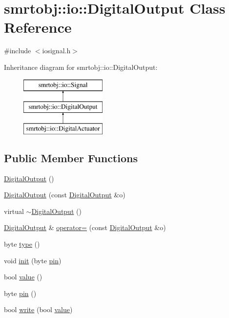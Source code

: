 \hypertarget{classsmrtobj_1_1io_1_1_digital_output}{}\section{smrtobj\+:\+:io\+:\+:Digital\+Output Class Reference}
\label{classsmrtobj_1_1io_1_1_digital_output}


{\ttfamily \#include $<$iosignal.\+h$>$}

Inheritance diagram for smrtobj\+:\+:io\+:\+:Digital\+Output\+:\begin{figure}[H]
\begin{center}
\leavevmode
\includegraphics[height=3.000000cm]{classsmrtobj_1_1io_1_1_digital_output}
\end{center}
\end{figure}
\subsection*{Public Member Functions}
\begin{DoxyCompactItemize}
\item 
\hyperlink{classsmrtobj_1_1io_1_1_digital_output_a4f8b427dd834072bc274cfe8fd44f1ac}{Digital\+Output} ()
\item 
\hyperlink{classsmrtobj_1_1io_1_1_digital_output_a6ccc224b58e5ab04c327b3fd62f592ef}{Digital\+Output} (const \hyperlink{classsmrtobj_1_1io_1_1_digital_output}{Digital\+Output} \&o)
\item 
virtual \hyperlink{classsmrtobj_1_1io_1_1_digital_output_a43e0743797dcbdf400340a94c38c8da0}{$\sim$\+Digital\+Output} ()
\item 
\hyperlink{classsmrtobj_1_1io_1_1_digital_output}{Digital\+Output} \& \hyperlink{classsmrtobj_1_1io_1_1_digital_output_ae7d37f28cc4e9db61f6853cccfe4f6c5}{operator=} (const \hyperlink{classsmrtobj_1_1io_1_1_digital_output}{Digital\+Output} \&o)
\item 
byte \hyperlink{classsmrtobj_1_1io_1_1_digital_output_a9c9e665bb38c2c8164cfce1a3ce94dcc}{type} ()
\item 
void \hyperlink{classsmrtobj_1_1io_1_1_digital_output_a62cc30d2d5e3ea1d11bfd5b3a5b59312}{init} (byte \hyperlink{classsmrtobj_1_1io_1_1_digital_output_aef26855d23bba50d3b47ec76443fe1c9}{pin})
\item 
bool \hyperlink{classsmrtobj_1_1io_1_1_digital_output_a0e7ee22a168f81b438fd513ceab22e27}{value} ()
\item 
byte \hyperlink{classsmrtobj_1_1io_1_1_digital_output_aef26855d23bba50d3b47ec76443fe1c9}{pin} ()
\item 
bool \hyperlink{classsmrtobj_1_1io_1_1_digital_output_a12fab5b3bd5012fa042c6d3cb6ab2663}{write} (bool \hyperlink{classsmrtobj_1_1io_1_1_digital_output_a0e7ee22a168f81b438fd513ceab22e27}{value})
\end{DoxyCompactItemize}
